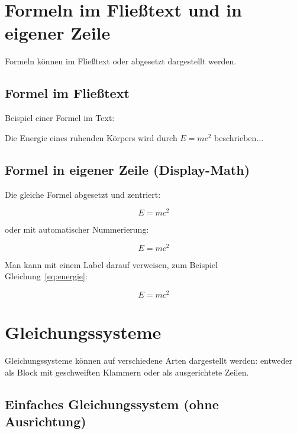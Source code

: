\documentclass[twoside]{scrreprt}
\begin{document}

\section{Formeln im Fließtext und in eigener Zeile}

Formeln können im Fließtext oder abgesetzt dargestellt werden.

\subsection{Formel im Fließtext}

Beispiel einer Formel im Text:

\noindent Die Energie eines ruhenden Körpers wird durch $E = mc^2$ beschrieben...

\subsection{Formel in eigener Zeile (Display-Math)}

Die gleiche Formel abgesetzt und zentriert:

\[
E = mc^2
\]

\noindent oder mit automatischer Nummerierung:

\begin{equation}
E = mc^2
\end{equation}

\noindent Man kann mit einem Label darauf verweisen, zum Beispiel Gleichung~\eqref{eq:energie}:

\begin{equation}
E = mc^2
\label{eq:energie}
\end{equation}

\section{Gleichungssysteme}

Gleichungssysteme können auf verschiedene Arten dargestellt werden:
entweder als Block mit geschweiften Klammern oder als ausgerichtete Zeilen.

\subsection{Einfaches Gleichungssystem (ohne Ausrichtung)}
\end{document}
